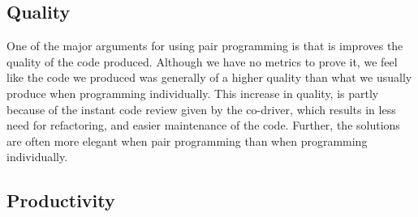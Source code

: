 \subsection{Quality}
One of the major arguments for using pair programming is that is improves the quality of the code produced.
Although we have no metrics to prove it, we feel like the code we produced was generally of a higher quality than what we usually produce when programming individually.
This increase in quality, is partly because of the instant code review given by the co-driver, which results in less need for refactoring, and easier maintenance of the code.
Further, the solutions are often more elegant when pair programming than when programming individually.


\subsection{Productivity}







